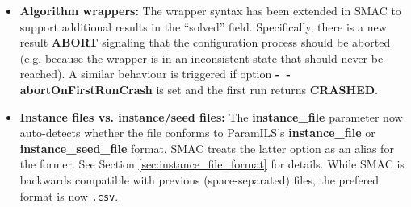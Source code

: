 \begin{itemize}
\item \textbf{Algorithm wrappers:} 
The wrapper syntax has been extended in SMAC to support additional results in the ``solved'' field. Specifically, there is a new result \textbf{ABORT} signaling that the configuration process should be aborted (e.g. because the wrapper is in an inconsistent state that should never be reached). A similar behaviour is triggered if option \textbf{-~$\!$-abortOnFirstRunCrash} is set and the first run returns \textbf{CRASHED}.

\item \textbf{Instance files vs. instance/seed files:} 
The \textbf{instance\_file} parameter now auto-detects whether the file conforms to ParamILS's \textbf{instance\_file} or \textbf{instance\_seed\_file} format. SMAC treats the latter option as an alias for the former. See Section \ref{sec:instance_file_format} for details.
While SMAC is backwards compatible with previous (space-separated) files, the prefered format is now \texttt{.csv}.
\end{itemize}
